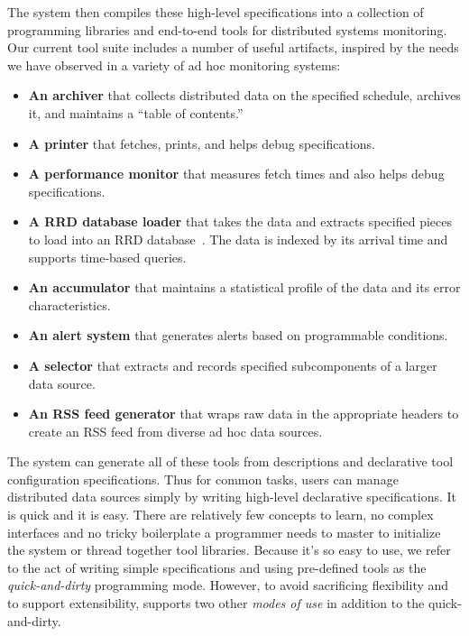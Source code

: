 The \padsd{} system then compiles these high-level specifications into
a collection of programming libraries and end-to-end tools for
distributed systems monitoring.  Our current tool suite includes a
number of useful artifacts, inspired by the needs we have observed in
a variety of ad hoc monitoring systems:

\begin{itemize}
\item {\bf An archiver} that collects distributed data on the specified 
schedule, archives it, and maintains a ``table of contents.''
\item {\bf A printer} that fetches, prints, and helps debug
specifications.
\item {\bf A performance monitor} that measures fetch times and also helps
debug specifications.
\item {\bf A RRD database loader} that takes the data and extracts specified 
pieces to load into an RRD database~\cite{rrdtool}.  The data is 
indexed by its arrival time and supports time-based queries.  
\item {\bf An accumulator} that maintains a statistical profile of the 
data and its error characteristics.  
\item {\bf An alert system} that generates alerts based on programmable 
conditions.
\item {\bf A selector} that extracts and records specified 
subcomponents of a larger data source.
\item {\bf An RSS feed generator} that wraps raw data in the appropriate 
headers to create an RSS feed from diverse ad hoc data sources.
\end{itemize}

The system can generate all of these tools from \padsd{} descriptions
and declarative tool configuration specifications.  Thus for common
tasks, users can manage distributed data sources simply by writing
high-level declarative specifications.  It is quick and it is easy. There
are relatively few concepts to learn, no complex interfaces and no
tricky boilerplate a programmer needs to master to initialize 
the system or thread together tool libraries.  Because it's so
easy to use, we refer to the act of writing simple specifications
and using pre-defined tools as the {\em quick-and-dirty} \padsd{} programming
mode.  However, to avoid sacrificing flexibility and to support extensibility,
\padsd{} supports two other {\em modes of use} in addition to the 
quick-and-dirty.

